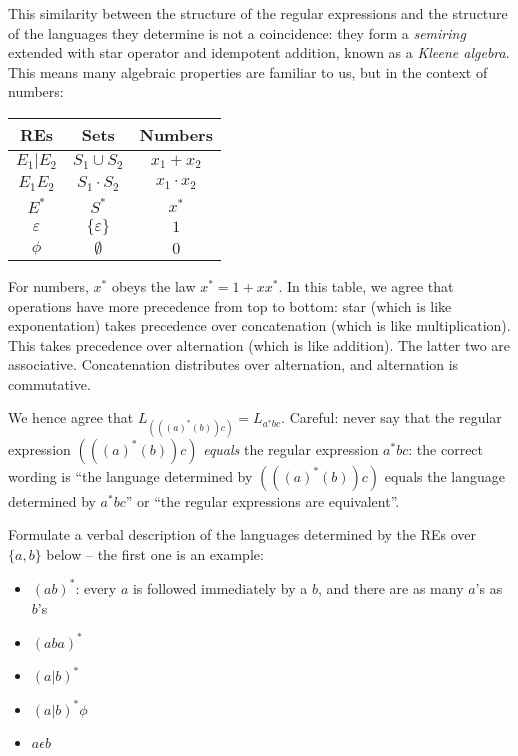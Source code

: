 This similarity between the structure of the regular expressions and
the structure of the languages they determine is not a coincidence: they form a \emph{semiring} extended with star operator and idempotent addition, known as a \emph{Kleene algebra}. This means many algebraic properties are familiar to us, but in the context of numbers:
\begin{center}
\begin{tabular}{ccc}
	\textbf{REs} & \textbf{Sets} & \textbf{Numbers} \\\hline\hline
	$E_1|E_2$ & $S_1\cup S_2$ & $x_1 + x_2$ \\\hline
	$E_1E_2$ & $S_1\cdot S_2$ & $x_1\cdot x_2$ \\\hline
	$E^*$ & $S^*$ & $x^*$ \\ \hline
	$\varepsilon$ & $\{\varepsilon\}$ & $1$ \\	\hline
	$\phi$ & $\emptyset$ & $0$ 
\end{tabular}
\end{center}
For numbers, $x^*$ obeys the law $x^* = 1 + xx^*$. In this table, we agree that operations have more precedence from top to bottom: star (which is like exponentation) takes precedence over concatenation (which is like multiplication). This takes precedence over alternation (which is like addition). The latter two are associative. Concatenation distributes over alternation, and alternation is commutative.

We hence agree that $L_{(((a)^*(b))c)} = L_{a^*bc}$. Careful:
never say that the regular expression $(((a)^*(b))c)$ \emph{equals} the
regular expression $a^*bc$: the correct wording is ``the language
determined by $(((a)^*(b))c)$ equals the language determined by
$a^*bc$'' or ``the regular expressions are equivalent''.

\begin{exercise}
Formulate a verbal description of the languages determined by the REs
over $\{a,b\}$ below -- the first one is an example:

\begin{itemize}
\item $(ab)^*$: every $a$ is followed immediately by a $b$, and there are as
many $a$'s as $b$'s

\item $(aba)^*$

\item $(a|b)^*$

\item $(a|b)^*\phi$

\item $a \epsilon b$
\end{itemize}
\end{exercise}

